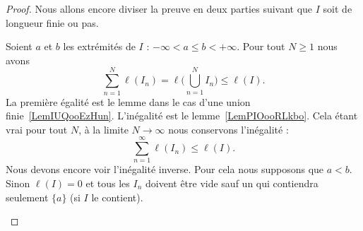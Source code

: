 \begin{proof}
	Nous allons encore diviser la preuve en deux parties suivant que \( I\) soit de longueur finie ou pas.
	\begin{subproof}


		Soient \( a\) et \( b\) les extrémités de \( I\) : \( -\infty<a\leq b< +\infty\). Pour tout \( N\geq 1\) nous avons
		\begin{equation}
			\sum_{n=1}^N\ell(I_n)=\ell\big( \bigcup_{n=1}^NI_n \big)\leq \ell(I).
		\end{equation}
		La première égalité est le lemme dans le cas d'une union finie~\ref{LemIUQooEzHun}. L'inégalité est le lemme~\ref{LemPIOooRLkbo}. Cela étant vrai pour tout \( N\), à la limite \( N\to\infty\) nous conservons l'inégalité :
		\begin{equation}
			\sum_{n=1}^{\infty}\ell(I_n)\leq \ell(I).
		\end{equation}
		Nous devons encore voir l'inégalité inverse. Pour cela nous supposons que \( a<b\). Sinon \( \ell(I)=0\) et tous les \( I_n\) doivent être vide sauf un qui contiendra seulement \( \{ a \}\) (si \( I\) le contient).


\end{subproof}
\end{proof}
